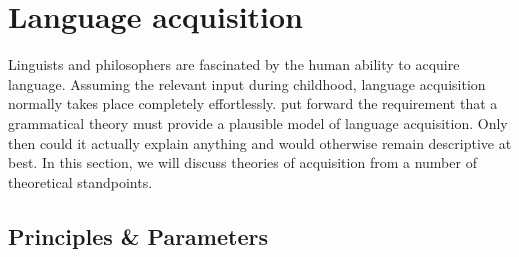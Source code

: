 \chapter{Language acquisition}
\label{chap-acquisition}

Linguists and philosophers are fascinated by the human ability to acquire language. Assuming the relevant input during childhood,
language acquisition normally takes place completely effortlessly.
\citet[--25]{Chomsky65a} put forward the requirement that a grammatical theory must provide a plausible model of language acquisition.
Only then could it actually explain anything and would otherwise remain descriptive at best. In this section, we will discuss
theories of acquisition from a number of theoretical standpoints.


\section{Principles \& Parameters}
\label{Abschnitt-PP}\label{sec-pro-drop}\label{section-PP}

